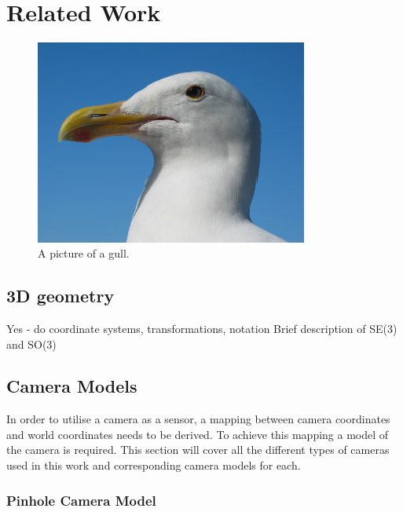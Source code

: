 \chapter{Related Work}
\label{chapter:Related_Work}

\begin{figure}[h!]
  \caption{A picture of a gull.}
  \centering
    \includegraphics[width=0.8\textwidth]{chapters/images/gull}
\end{figure}

\section{3D geometry}

Yes  - do coordinate systems, transformations, notation
Brief description of SE(3) and SO(3)

\section{Camera Models}

In order to utilise a camera as a sensor, a mapping between camera coordinates and world coordinates
needs to be derived.  To achieve this mapping a model of the camera is required.  This section will
cover all the different types of cameras used in this work and corresponding camera models for
each. 

\subsection{Pinhole Camera Model}

